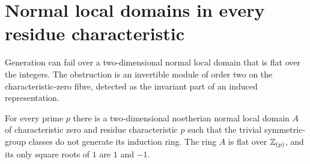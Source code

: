 \section{Normal local domains in every residue characteristic}

Generation can fail over a two-dimensional normal local domain that
is flat over the integers.  The obstruction is an invertible module
of order two on the characteristic-zero fibre, detected as the
invariant part of an induced representation.

\begin{theorem}\label{thm:normal-domain-counterexample}
\label{thm:normal-surface-counterexample}
For every prime $p$ there is a two-dimensional noetherian normal local
domain $A$ of characteristic zero and residue characteristic $p$ such
that the trivial symmetric-group classes do not generate its induction
ring.  The ring $A$ is flat over $\mathbb Z_{(p)}$, and its only square roots
of $1$ are $1$ and $-1$.
\end{theorem}

